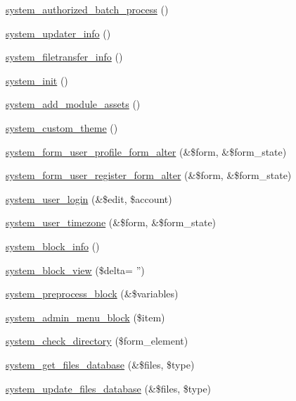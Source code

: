 \begin{DoxyCompactItemize}
\item 
\hyperlink{group__authorize_ga049418587e2e337a471f3b707d501196}{system\_\-authorized\_\-batch\_\-process} ()
\item 
\hyperlink{system_8module_a10c5077ea405b6e4e312291299687e75}{system\_\-updater\_\-info} ()
\item 
\hyperlink{system_8module_a56c90d331efe545cec21cc4cc9cede5f}{system\_\-filetransfer\_\-info} ()
\item 
\hyperlink{system_8module_ac6847a570b3e5f0fbda1802e90d066aa}{system\_\-init} ()
\item 
\hyperlink{system_8module_a18ac9a2acd0bfebb08156b711c8451a3}{system\_\-add\_\-module\_\-assets} ()
\item 
\hyperlink{system_8module_aa646e2eedcee8087ba2cd91914e7fbdc}{system\_\-custom\_\-theme} ()
\item 
\hyperlink{system_8module_ae5d1fb61b3099b07f38b7a328eea59a9}{system\_\-form\_\-user\_\-profile\_\-form\_\-alter} (\&\$form, \&\$form\_\-state)
\item 
\hyperlink{system_8module_ad535a7c29e92dc0394103a6ea1de3886}{system\_\-form\_\-user\_\-register\_\-form\_\-alter} (\&\$form, \&\$form\_\-state)
\item 
\hyperlink{system_8module_a4b41b351fd76cd41fe10c3ffe1e62504}{system\_\-user\_\-login} (\&\$edit, \$account)
\item 
\hyperlink{system_8module_a087533e7ffcffe8c417f2e2ef12c6f62}{system\_\-user\_\-timezone} (\&\$form, \&\$form\_\-state)
\item 
\hyperlink{system_8module_a28046ddc2ca1921e14019e2f3cc9175c}{system\_\-block\_\-info} ()
\item 
\hyperlink{system_8module_a6afe2fa1e31a2aef9594ff49018634d8}{system\_\-block\_\-view} (\$delta= '')
\item 
\hyperlink{system_8module_a32befafe4460ad324666b282350deb02}{system\_\-preprocess\_\-block} (\&\$variables)
\item 
\hyperlink{system_8module_aefe1548b98360e16fcdf579045d5c303}{system\_\-admin\_\-menu\_\-block} (\$item)
\item 
\hyperlink{system_8module_ab2199f53b5eed000b9722bb6de83f57f}{system\_\-check\_\-directory} (\$form\_\-element)
\item 
\hyperlink{system_8module_a0851ffa40e4bc737b29677e9b397caac}{system\_\-get\_\-files\_\-database} (\&\$files, \$type)
\item 
\hyperlink{system_8module_aceaee6704abc9e249d9ef79918884b7a}{system\_\-update\_\-files\_\-database} (\&\$files, \$type)

\end{DoxyCompactItemize}
